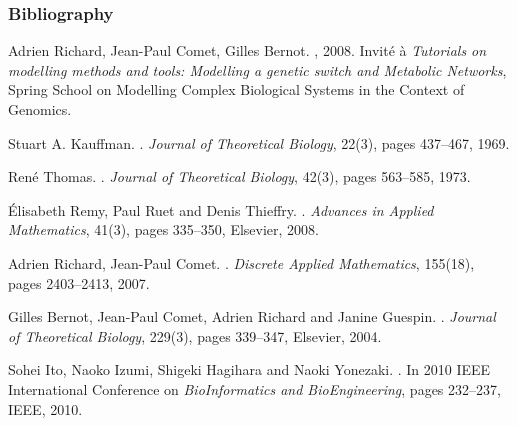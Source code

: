 \begin{frame}[c]
  \frametitle{Bibliography}

\small
\setlength{\parindent}{-1em}
\setlength{\parskip}{0.5em}

\tcitebullet Adrien Richard, Jean-Paul Comet, Gilles Bernot.
, 2008.
Invité à \textit{Tutorials on modelling methods and tools: Modelling a genetic switch and Metabolic Networks}, Spring School on Modelling Complex Biological Systems in the Context of Genomics.

\tcitebullet Stuart A. Kauffman.
.
\textit{Journal of Theoretical Biology}, 22(3), pages 437--467, 1969.

\tcitebullet René Thomas.
.
\textit{Journal of Theoretical Biology}, 42(3), pages 563--585, 1973.

\tcitebullet Élisabeth Remy, Paul Ruet and Denis Thieffry.
.
\textit{Advances in Applied Mathematics}, 41(3), pages 335--350, Elsevier, 2008.

\tcitebullet Adrien Richard, Jean-Paul Comet.
.
\textit{Discrete Applied Mathematics}, 155(18), pages 2403--2413, 2007.

\tcitebullet Gilles Bernot, Jean-Paul Comet, Adrien Richard and Janine Guespin.
.
\textit{Journal of Theoretical Biology}, 229(3), pages 339--347, Elsevier, 2004.

\tcitebullet Sohei Ito, Naoko Izumi, Shigeki Hagihara and Naoki Yonezaki.
.
In 2010 IEEE International Conference on \textit{BioInformatics and BioEngineering}, pages 232--237, IEEE, 2010.

\end{frame}



